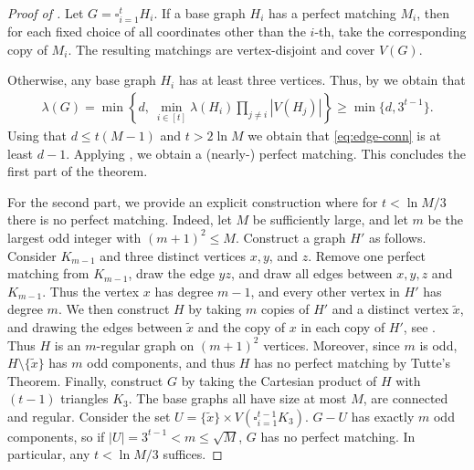\documentclass[notitlepage]{scrartcl}
\begin{document}
\begin{proof}[Proof of ]
Let $G=\square_{i=1}^t H_i$. If a base graph $H_i$ has a perfect matching $M_i$, then for each fixed choice of all coordinates other than the $i$-th, take the corresponding copy of $M_i$. The resulting matchings are vertex-disjoint and cover $V(G)$.

Otherwise, any base graph $H_i$ has at least three vertices. Thus, by  we obtain that
\begin{align} \label{eq:edge-conn}
      \lambda(G)
  =\min\left\{d,\ \min_{i\in[t]}\lambda(H_i)\prod_{j\ne i}|V(H_j)|\right\} \geq \min\{d, 3^{t-1}\}.
\end{align}
Using that $d \leq t(M-1)$ and $t > 2\ln M$ we obtain that \eqref{eq:edge-conn} is at least $d-1$.
Applying , we obtain a (nearly-) perfect matching. This concludes the first part of the theorem.

For the second part, we provide an explicit construction where for $t<\ln M/3$ there is no perfect matching. Indeed, let $M$ be sufficiently large, and let $m$ be the largest odd integer with $(m+1)^2\le M$. 
Construct a graph $H'$ as follows. Consider $K_{m-1}$ and three distinct vertices $x,y$, and $z$. Remove one perfect matching from $K_{m-1}$, draw the edge $yz$, and draw all edges between $x,y,z$ and $K_{m-1}$. Thus the vertex $x$ has degree $m-1$, and every other vertex in $H'$ has degree $m$. We then construct $H$ by taking $m$ copies of $H'$ and a distinct vertex $\tilde x$, and drawing the edges between $\tilde x$ and the copy of $x$ in each copy of $H'$, see . Thus $H$ is an $m$-regular graph on $(m+1)^2$ vertices. Moreover, since $m$ is odd, $H\setminus \{\tilde x\}$ has $m$ odd components, and thus $H$ has no perfect matching by Tutte's Theorem. Finally, construct $G$ by taking the Cartesian product of $H$ with $(t-1)$ triangles $K_3$. The base graphs all have size at most $M$, are connected and regular. Consider the set $U=\{\tilde x\}\times V(\square_{i=1}^{t-1}K_3)$. $G-U$ has exactly $m$ odd components, so if $|U|=3^{t-1}<m\le \sqrt{M}$, $G$ has no perfect matching. In particular, any $t<\ln M/3$ suffices.
\end{proof}
\end{document}
